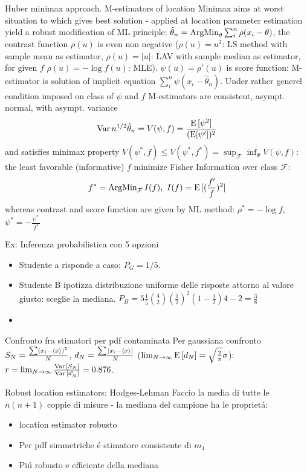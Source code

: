\documentclass[asd-beamer.tex]{subfiles}
\begin{document}
\begin{frame}{Huber minimax approach. M-estimators of location}
	Minimax aims at worst situation to which gives best solution - applied at location parameter estimation yield a robust modification of ML principle: $\hat{\theta}_n=\operatorname{ArgMin}_{\theta}\sum_i^n\rho(x_i-\theta)$, the contrast function $\rho(u)$ is even non negative ($\rho(u)=u^2$: LS method with sample mean as estimator, $\rho(u)=|u|$: LAV with sample median as estimator, for given $f$ $\rho(u)=-\log{f(u)}$: MLE). $\psi(u)=\rho'(u)$ is score function: M-estimator is solution of implicit equation $\sum_i^n\psi(x_i-\hat{\theta}_n)$.
	Under rather generel condition imposed on class of $\psi$ and $f$ M-estimators are consistent, asympt. normal, with asympt. variance
	\[\operatorname{Var}{n^{1/2}\hat{\theta}_n}=V(\psi,f)=\frac{\operatorname{E}{[\psi^2]}}{(\operatorname{E}[\psi'])^2}\]
	and satisfies minimax property $V(\psi^*,f)\leq V(\psi^*,f^*)=\sup_{\mathcal{F}}\inf_{\Psi}V(\psi,f)$: the least favorable (informative) $f$ minimize Fisher Information over class $\mathcal{F}$:
	\[f^*=\argmin_{\mathcal{F}}I(f),\ I(f)=\E{[(\frac{f'}{f})^2]}\]
	whereas contrast and score function are given by ML method: $\rho^*=-\log{f}$, $\psi^*=-\frac{\psi^{*'}}{f^*}$
\end{frame}

\begin{wordonframe}{Ex: Inferenza probabilistica}
 con  5 opzioni
\begin{itemize}
\item Studente a risponde a caso: $P_G=1/5$.
\item Studente B ipotizza distribuzione uniforme delle risposte attorno al valore giusto: sceglie la mediana. $P_B=5\frac{1}{5}\binom{4}{2}(\frac{1}{2})^2(1-\frac{1}{2}){4-2}=\frac{3}{8}$
\item {}
\end{itemize}

\end{wordonframe}

\begin{wordonframe}{Confronto fra stimatori per pdf contaminata}
Per gaussiana confronto $S_N=\frac{\sum(x_i-\langle x \rangle)^2}{N}$, $d_N=\frac{\sum|x_i-\langle x \rangle|}{N}$ ($\lim_{N\to\infty}\operatorname{E}{[d_N]}=\sqrt{\frac{2}{\pi}}\sigma$): $r=\lim_{N\to\infty}\frac{\operatorname{Var}{[S_N]}}{\operatorname{Var}{[d_N']}}=0.876$.
\end{wordonframe}

\begin{frame}{Robust location estimators: Hodges-Lehman}
Faccio la media di tutte le $n(n+1)$ coppie di misure - la mediana del campione ha le propriet\'a:
\begin{itemize}
\item location estimator robusto
\item Per pdf simmetriche \'e stimatore consistente di $m_1$
\item Pi\'u robusto e efficiente della mediana	
\end{itemize}
\end{frame}
\end{document}
